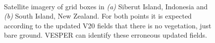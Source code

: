 \documentclass[hess, manuscript]{copernicus}
\begin{document}
	\begin{figure}[h!]
	 \\
	\caption{Satellite imagery of grid boxes in \textit{(a)} Siberut Island, Indonesia  and \textit{(b)} South Island, New Zealand. For both points it is expected according to the updated V20 fields that there is no vegetation, just bare ground. VESPER can identify these erroneous updated fields.} 
	\label{fig:cvh}
\end{figure}
\end{document}
